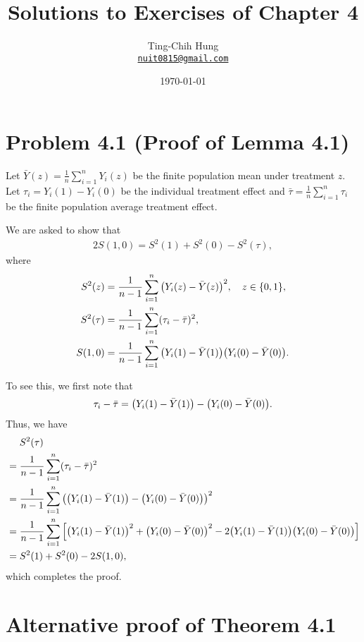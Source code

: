 \documentclass[10pt]{article}
\title{Solutions to Exercises of Chapter 4}
\author{Ting-Chih Hung \\ \href{mailto:nuit0815@gmail.com}{\texttt{nuit0815@gmail.com}}}
\date{\today}
\begin{document}
\maketitle


\section*{Problem 4.1 (Proof of Lemma 4.1)}

Let $\bar{Y}(z) = \frac{1}{n} \sum_{i=1}^n Y_i(z)$ be the finite population mean
under treatment $z$.
Let $\tau_i = Y_i(1) - Y_i(0)$ be the individual treatment effect
and $\bar{\tau} = \frac{1}{n} \sum_{i=1}^n \tau_i$ be 
the finite population average treatment effect.

We are asked to show that
\begin{align*}
  2S(1, 0) = S^2(1) + S^2(0) - S^2(\tau),
\end{align*}
where
\begin{align*}
  S^2(z) &= \frac{1}{n - 1} \sum_{i=1}^n {\left( Y_i(z) - \bar{Y}(z) \right)}^2, \quad z \in {\left\lbrace 0, 1 \right\rbrace}, \\
  S^2(\tau) &= \frac{1}{n - 1} \sum_{i=1}^n (\tau_i - \bar{\tau})^2, \\
  S(1, 0) &= \frac{1}{n - 1} \sum_{i=1}^n {\left( Y_i(1) - \bar{Y}(1) \right)} {\left( Y_i(0) - \bar{Y}(0) \right)}.
\end{align*}

To see this, we first note that
\begin{align*}
  \tau_i - \bar{\tau}
  = {\left( Y_i(1) - \bar{Y}(1) \right)} - {\left( Y_i(0) - \bar{Y}(0) \right)}.
\end{align*}
Thus, we have
\begin{align*}
  &\mathrel{\phantom{=}}S^2(\tau) \\
  &= \frac{1}{n - 1} \sum_{i=1}^n (\tau_i - \bar{\tau})^2 \\
  &= \frac{1}{n - 1} \sum_{i=1}^n {\left( {\left( Y_i(1) - \bar{Y}(1) \right)} - {\left( Y_i(0) - \bar{Y}(0) \right)} \right)}^2 \\
  &= \frac{1}{n - 1} \sum_{i=1}^n {\left[ 
    {\left( Y_i(1) - \bar{Y}(1) \right)}^2
    + {\left( Y_i(0) - \bar{Y}(0) \right)}^2
    - 2{\left( Y_i(1) - \bar{Y}(1) \right)}{\left( Y_i(0) - \bar{Y}(0) \right)}
   \right]} \\
  &= S^2(1) + S^2(0) - 2S(1, 0),
\end{align*}
which completes the proof.

\section*{Alternative proof of Theorem 4.1}
\end{document}
